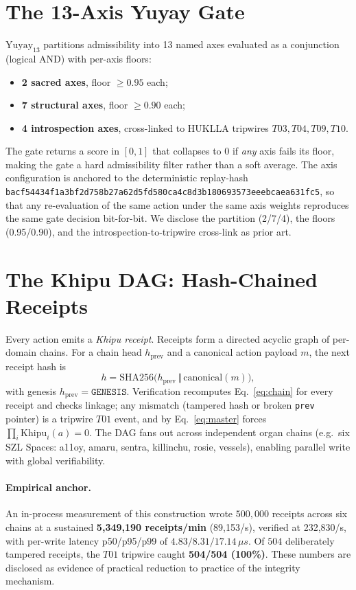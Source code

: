 \documentclass[10pt,conference]{IEEEtran}
\begin{document}
\section{The 13-Axis Yuyay Gate}\label{sec:yuyay}
$\mathrm{Yuyay}_{13}$ partitions admissibility into 13 named axes evaluated as a
conjunction (logical AND) with per-axis floors:
\begin{itemize}[leftmargin=1.2em]
\item \textbf{2 sacred axes}, floor $\geq 0.95$ each;
\item \textbf{7 structural axes}, floor $\geq 0.90$ each;
\item \textbf{4 introspection axes}, cross-linked to HUKLLA tripwires
$T03, T04, T09, T10$.
\end{itemize}
The gate returns a score in $[0,1]$ that collapses to $0$ if \emph{any} axis fails its
floor, making the gate a hard admissibility filter rather than a soft average. The axis
configuration is anchored to the deterministic replay-hash
\texttt{bacf54434f1a3bf2d758b27a62d5fd580ca4c8d3b180693573eeebcaea631fc5}, so that any
re-evaluation of the same action under the same axis weights reproduces the same gate
decision bit-for-bit. We disclose the partition (2/7/4), the floors (0.95/0.90), and the
introspection-to-tripwire cross-link as prior art.

\section{The Khipu DAG: Hash-Chained Receipts}\label{sec:khipu}
Every action emits a \emph{Khipu receipt}. Receipts form a directed acyclic graph of
per-domain chains. For a chain head $h_{\text{prev}}$ and a canonical action payload
$m$, the next receipt hash is
\begin{equation}
h = \mathrm{SHA256}\big(h_{\text{prev}} \,\Vert\, \mathrm{canonical}(m)\big),
\label{eq:chain}
\end{equation}
with genesis $h_{\text{prev}} = \texttt{GENESIS}$. Verification recomputes
Eq.~\eqref{eq:chain} for every receipt and checks linkage; any mismatch (tampered hash
or broken \texttt{prev} pointer) is a tripwire $T01$ event, and by
Eq.~\eqref{eq:master} forces $\prod_i \mathrm{Khipu}_i(a)=0$. The DAG fans out across
independent organ chains (e.g.\ six SZL Spaces: a11oy, amaru, sentra, killinchu, rosie,
vessels), enabling parallel write with global verifiability.

\paragraph{Empirical anchor.} An in-process measurement of this construction wrote
$500{,}000$ receipts across six chains at a sustained
\textbf{5{,}349{,}190 receipts/min} (89{,}153/s), verified at 232{,}830/s, with
per-write latency p50/p95/p99 of $4.83/8.31/17.14\,\mu s$. Of $504$ deliberately
tampered receipts, the $T01$ tripwire caught \textbf{504/504 (100\%)}. These numbers are
disclosed as evidence of practical reduction to practice of the integrity mechanism.
\end{document}
